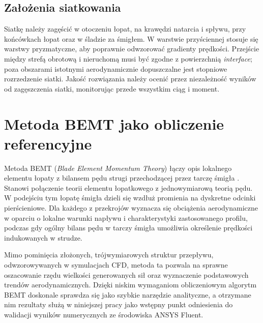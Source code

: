 \documentclass[12pt,a4paper,twoside]{article}
\begin{document}
	\subsection{Założenia siatkowania}
	Siatkę należy zagęścić w otoczeniu łopat, na krawędzi natarcia i spływu, przy końcówkach łopat oraz w śladzie za śmigłem. W warstwie przyściennej stosuje się warstwy pryzmatyczne, aby poprawnie odwzorować gradienty prędkości. Przejście między strefą obrotową i nieruchomą musi być zgodne z powierzchnią \textit{interface}; poza obszarami istotnymi aerodynamicznie dopuszczalne jest stopniowe rozrzedzenie siatki. Jakość rozwiązania należy ocenić przez niezależność wyników od zagęszczenia siatki, monitorując przede wszystkim ciąg i moment.
	
	\section{Metoda BEMT jako obliczenie referencyjne}
	Metoda BEMT (\textit{Blade Element Momentum Theory}) łączy opis lokalnego elementu łopaty z bilansem pędu strugi przechodzącej przez tarczę śmigła \cite{glauert,moriarty}. Stanowi połączenie teorii elementu łopatkowego z jednowymiarową teorią pędu. W podejściu tym łopatę śmigła dzieli się wzdłuż promienia na dyskretne odcinki pierścieniowe. Dla każdego z przekrojów wyznacza się obciążenia aerodynamiczne w oparciu o lokalne warunki napływu i charakterystyki zastosowanego profilu, podczas gdy ogólny bilans pędu w tarczy śmigła umożliwia określenie prędkości indukowanych w strudze.
	
	Mimo pominięcia złożonych, trójwymiarowych struktur przepływu, odwzorowywanych w symulacjach CFD, metoda ta pozwala na sprawne oszacowanie rzędu wielkości generowanych sił oraz wyznaczenie podstawowych trendów aerodynamicznych. Dzięki niskim wymaganiom obliczeniowym algorytm BEMT doskonale sprawdza się jako szybkie narzędzie analityczne, a otrzymane nim rezultaty służą w niniejszej pracy jako wstępny punkt odniesienia do walidacji wyników numerycznych ze środowiska ANSYS Fluent.
\end{document}
